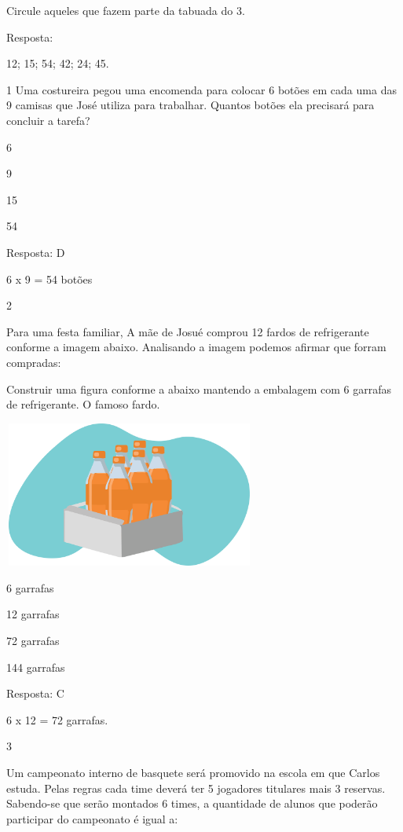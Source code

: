 Circule aqueles que fazem parte da tabuada do 3.

Resposta:

12; 15; 54; 42; 24; 45.


\num{1} Uma costureira pegou uma encomenda para colocar 6 botões em
cada uma das 9 camisas que José utiliza para trabalhar. Quantos botões
ela precisará para concluir a tarefa?

\begin{escolha}
    \item 6
    \item 9
    \item 15
    \item 54
\end{escolha}

Resposta: D

6 x 9 = 54 botões

\num{2}

Para uma festa familiar, A mãe de Josué comprou 12 fardos de
refrigerante conforme a imagem abaixo. Analisando a imagem podemos
afirmar que forram compradas:

Construir uma figura conforme a abaixo mantendo a embalagem com 6
garrafas de refrigerante. O famoso fardo.

\includegraphics[width=3.25862in,height=1.89183in]{media/image26.png}

\begin{escolha}

\item
  6 garrafas
\item
  12 garrafas
\item
  72 garrafas
\item
  144 garrafas
\end{escolha}

Resposta: C

6 x 12 = 72 garrafas.

\num{3}

Um campeonato interno de basquete será promovido na escola em que Carlos
estuda. Pelas regras cada time deverá ter 5 jogadores titulares mais 3
reservas. Sabendo-se que serão montados 6 times, a quantidade de alunos
que poderão participar do campeonato é igual a:

